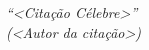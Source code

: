 \begin{epigrafe}
    \vspace*{\fill}
	\begin{flushright}
		\textit{%
		``<Citação Célebre>''\\
		(<Autor da citação>)}
	\end{flushright}
\end{epigrafe}